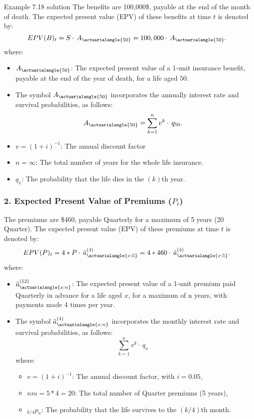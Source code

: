 \begin{solve}{}{Example 7.18 solution}
		The benefits are 100,000\$, payable at the end of the month of death. The expected present value (EPV) of these benefits at time \(t\) is denoted by:
		\[
		EPV(B)_t = S \cdot \,  A_{\actuarialangle{50}} = 100,000 \cdot \,  A_{\actuarialangle{50}}.
		\]
		where:
		\begin{itemize}
			\item \(A_{\actuarialangle{50}}\): The expected present value of a 1-unit insurance benefit, payable at the end of the year of death, for a life aged \(50\).
			\item The symbol \( A_{\actuarialangle{50}}\) incorporates the annually interest rate and survival probabilities, as follows:
			\[
			A_{\actuarialangle{50}} = \sum_{k=1}^{n} v^{k} \cdot \,q_{50}.
			\]
			\item \(v = (1+i)^{-1}\): The annual discount factor %
			\item \(n = \infty\): The total number of years for the whole life insurance.
			\item \(q_x\): The probability that the life dies in the \((k)\)th year.
		\end{itemize}
		
		\subsubsection*{2. Expected Present Value of Premiums (\(P_t\))}
		
		The premiums are \$460, payable Quarterly for a maximum of 5 years (20 Quarter). The expected present value (EPV) of these premiums at time \(t\) is denoted by:
		\[
		EPV(P)_t = 4 * P \cdot \, \ddot{a}_{\actuarialangle{x:5}}^{(4)} = 4 * 460 \cdot \, \ddot{a}_{\actuarialangle{x:5}}^{(4)}.
		\]
		where:
		\begin{itemize}
			\item \(\ddot{a}_{\actuarialangle{x:n}}^{(12)}\): The expected present value of a 1-unit premium paid Quarterly in advance for a life aged \(x\), for a maximum of n years, with payments made 4 times per year.
			\item The symbol \(\ddot{a}_{\actuarialangle{x:n}}^{(4)}\) incorporates the monthly interest rate and survival probabilities, as follows:
			\[
			\sum_{k=1}^{n} v^{k} \cdot \,q_{x}
			\]
			where:
			\begin{itemize}
				\item \(v = (1+i)^{-1}\): The annual discount factor, with \(i = 0.05\),
				\item \(nm = 5*4 = 20\): The total number of Quarter premiums (5 years),
				\item \(_{k/4}p_x\): The probability that the life survives to the \((k/4)\)th month.
			\end{itemize}
		\end{itemize}
		

\end{solve}
